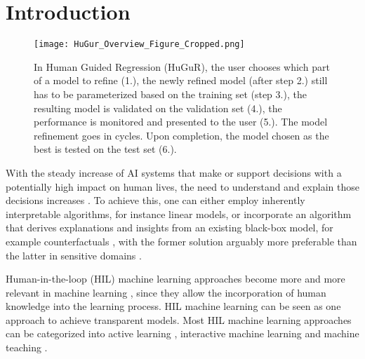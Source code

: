 \section{Introduction}
\label{introduction}





\begin{figure}[t!]
    \centering
\texttt{[image: HuGur\_Overview\_Figure\_Cropped.png]}
    \caption{In Human Guided Regression (HuGuR), the user 
    chooses which part of a model to refine (1.), the newly refined model (after step 2.) still has to be parameterized based on the training set (step 3.), the resulting model is validated on the validation set (4.), the performance is monitored and presented to the user (5.). The model refinement goes in cycles. Upon completion, the model chosen as the best is tested on the test set (6.).}
    \label{fig:overview}
\end{figure}

With the steady increase of AI systems that make or support decisions with a potentially high impact on human lives, the need to understand and explain those decisions increases \cite{xai_right}. To achieve this, one can either employ inherently interpretable algorithms, for instance linear models, or incorporate an algorithm that derives explanations and insights from an existing black-box model, for example counterfactuals \cite{counterfactuals},  with the former solution arguably more preferable than the latter in sensitive domains \cite{stop}.



Human-in-the-loop (HIL) machine learning approaches become more and more relevant in machine learning \cite{HILsurvey}, since they allow the incorporation of human knowledge into the learning process. HIL machine learning can be seen as one approach to achieve transparent models. Most HIL machine learning approaches can be categorized into active learning \cite{activelearning}, interactive machine learning \cite{interactivelearning} and machine teaching \cite{machineteaching1}.

